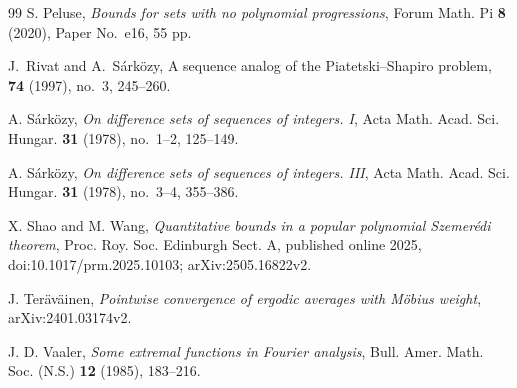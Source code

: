 \documentclass{amsart}
\newcommand{\1}{\mathbf 1}
\begin{document}
\begin{thebibliography}{99}
S. Peluse,
\emph{Bounds for sets with no polynomial progressions},
Forum Math. Pi \textbf{8} (2020), Paper No.~e16, 55 pp.

J.~Rivat and A.~S\'ark\"ozy,
\newblock A sequence analog of the Piatetski--Shapiro problem,
 {\bf 74} (1997), no.~3, 245--260.




A. S\'ark\"ozy,
\emph{On difference sets of sequences of integers. I},
Acta Math. Acad. Sci. Hungar. \textbf{31} (1978), no.~1--2,
125--149.

A. S\'ark\"ozy,
\emph{On difference sets of sequences of integers. III},
Acta Math. Acad. Sci. Hungar. \textbf{31} (1978), no.~3--4,
355--386.

X. Shao and M. Wang,
\emph{Quantitative bounds in a popular polynomial Szemer\'edi theorem},
Proc. Roy. Soc. Edinburgh Sect. A, published online 2025,
doi:10.1017/prm.2025.10103; arXiv:2505.16822v2.

J. Ter\"av\"ainen,
\emph{Pointwise convergence of ergodic averages with M\"obius weight},
arXiv:2401.03174v2.

J. D. Vaaler,
\emph{Some extremal functions in Fourier analysis},
Bull. Amer. Math. Soc. (N.S.) \textbf{12} (1985), 183--216.

\end{thebibliography}
\end{document}

